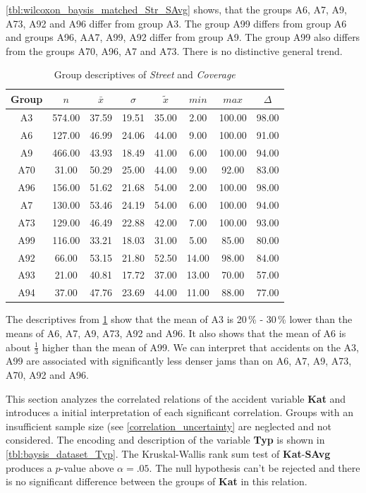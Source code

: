 \cref{tbl:wilcoxon_baysis_matched_Str_SAvg} shows, that the groups A6, A7, A9, A73, A92 and A96 differ from group A3. The group A99 differs from group A6 and groups A96, AA7, A99, A92 differ from group A9. The group A99 also differs from the groups A70, A96, A7 and A73. There is no distinctive general trend. 
\begin{table}[ht!]
	\tiny
	\centering
	\begin{tabular}{c|c|c|c|c|c|c|c}
	  	\toprule
	 	Group & $n$ & $\bar{x}$ & $\sigma$ & $\tilde{x}$ & $min$ & $max$ & $\Delta$ \\   
	  	\midrule
		A3 & 574.00 & 37.59 & 19.51 & 35.00 & 2.00 & 100.00 & 98.00 \\ 
	  	A6 & 127.00 & 46.99 & 24.06 & 44.00 & 9.00 & 100.00 & 91.00 \\ 
	  	A9 & 466.00 & 43.93 & 18.49 & 41.00 & 6.00 & 100.00 & 94.00 \\ 
	  	A70 & 31.00 & 50.29 & 25.00 & 44.00 & 9.00 & 92.00 & 83.00 \\ 
	  	A96 & 156.00 & 51.62 & 21.68 & 54.00 & 2.00 & 100.00 & 98.00 \\ 
	  	A7 & 130.00 & 53.46 & 24.19 & 54.00 & 6.00 & 100.00 & 94.00 \\ 
	  	A73 & 129.00 & 46.49 & 22.88 & 42.00 & 7.00 & 100.00 & 93.00 \\ 
	  	A99 & 116.00 & 33.21 & 18.03 & 31.00 & 5.00 & 85.00 & 80.00 \\ 
	  	A92 & 66.00 & 53.15 & 21.80 & 52.50 & 14.00 & 98.00 & 84.00 \\ 
	  	A93 & 21.00 & 40.81 & 17.72 & 37.00 & 13.00 & 70.00 & 57.00 \\ 
	  	A94 & 37.00 & 47.76 & 23.69 & 44.00 & 11.00 & 88.00 & 77.00 \\ 	
	  	\bottomrule
	\end{tabular}
	\caption{Group descriptives of \textit{Street} and \textit{Coverage}}
	\label{tbl:descriptives_baysis_matched_Str_Cov}
\end{table}
The descriptives from \cref{tbl:descriptives_baysis_matched_Str_Cov} show that the mean of A3 is 20\,\% - 30\,\% lower than the means of A6, A7, A9, A73, A92 and A96. It also shows that the mean of A6 is about $\frac{1}{3}$ higher than the mean of A99. We can interpret that accidents on the A3, A99 are associated with significantly less denser jams than on A6, A7, A9, A73, A70, A92 and A96.

This section analyzes the correlated relations of the accident variable \textbf{Kat} and introduces a initial interpretation of each significant correlation. Groups with an insufficient sample size (see \cref{correlation_uncertainty} are neglected and not considered. The encoding and description of the variable \textbf{Typ} is shown in \cref{tbl:baysis_dataset_Typ}. The Kruskal-Wallis rank sum test of \textbf{Kat}-\textbf{SAvg} produces a $p$-value above $\alpha=.05$. The null hypothesis can't be rejected and there is no significant difference between the groups of \textbf{Kat} in this relation.

